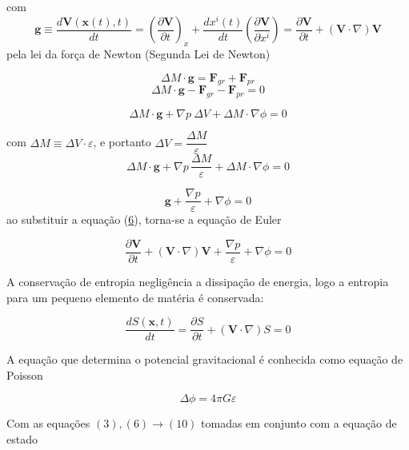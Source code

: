 \documentclass[a4paper,12pt]{article}
\begin{document}
com 
\begin{equation}\label{eq6}
	\textbf{g} \equiv \dfrac{d \textbf{V} (\textbf{x} (t), t)}{dt} = \left( \dfrac{\partial \textbf{V}}{\partial t} \right)_x + \dfrac{dx^i(t)}{dt}\left( \dfrac{\partial \textbf{V}}{\partial x^i} \right) = \frac{\partial \textbf{V}}{\partial t} + (\textbf{V} \cdot \nabla ) \textbf{V}
\end{equation}
\newline
pela lei da força de Newton (Segunda Lei de Newton)

\begin{equation}\label{eq7}
	\Delta M \cdot \textbf{g} = \textbf{F}_{gr} + \textbf{F}_{pr}
\end{equation}
\newline
$$\Delta M \cdot \textbf{g} -  \textbf{F}_{gr} - \textbf{F}_{pr} = 0 $$

$$\Delta M \cdot \textbf{g}  + \nabla p \ \Delta V + \Delta M \cdot \nabla \phi=0 $$

com $\Delta M \equiv \Delta V \cdot \varepsilon$, e portanto $\Delta V = \dfrac{\Delta M}{\varepsilon}$
$$\Delta M \cdot \textbf{g}  + \nabla p \,\dfrac{\Delta M}{\varepsilon} + \Delta M \cdot \nabla \phi=0 $$

$$\textbf{g}  + \dfrac{\nabla p}{\varepsilon} + \nabla \phi=0 $$
ao substituir a equação (\hyperref[eq6]{6}), torna-se a equação de Euler

\begin{equation}\label{eq8}
	\dfrac{\partial \textbf{V} }{\partial t} + (\textbf{V} \cdot \nabla ) \textbf{V} + \frac{\nabla p}{\varepsilon} + \nabla \phi =0
\end{equation}

A conservação de entropia negligência a dissipação de energia, logo a entropia para um pequeno elemento de matéria é conservada:

\begin{equation}\label{eq9}
	\dfrac{dS(\textbf{x},t)}{dt} = \dfrac{\partial S}{\partial t} + ( \textbf{V} \cdot \nabla) S = 0
\end{equation}

A equação que determina o potencial gravitacional é conhecida como equação de Poisson

\begin{equation}\label{eq10}
	\Delta\phi = 4\pi G\varepsilon
\end{equation}

Com as equações $(3), (6)\to (10)$ tomadas em conjunto com a equação de estado
\end{document}
